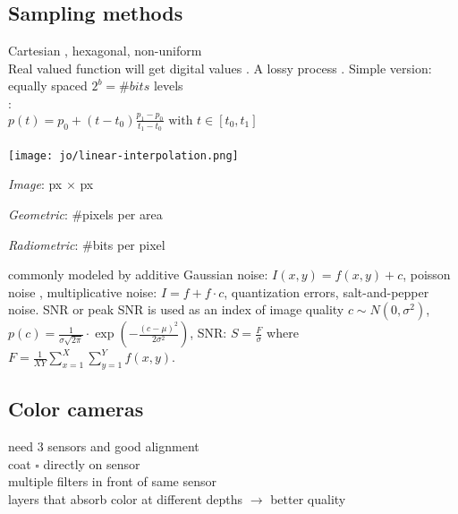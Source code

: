 \subsection*{Sampling methods}
Cartesian , hexagonal, non-uniform\\
 Real valued function will get digital values . A lossy process . Simple version: equally spaced $2^b = \#bits$ levels\\
: \\
$p(t) = p_0 + (t - t_0)\frac{p_1 - p_0}{t_1 - t_0} \text{ with } t \in [t_0, t_1]$ \\

     \\
\texttt{[image: jo/linear-interpolation.png]} \\ 
    \begin{compactitem}
      \item \textit{Image}: px \(\times\) px
      \item \textit{Geometric}: \#pixels per area
      \item \textit{Radiometric}: \#bits per pixel
    \end{compactitem}
 commonly modeled by additive Gaussian noise: $I(x, y) = f(x, y) + c$, poisson noise , multiplicative noise: $I = f + f \cdot c$, quantization errors, salt-and-pepper noise. SNR or peak SNR is used as an index of image quality $c \sim N(0, \sigma^2)$, $p(c) = \frac{1}{\sigma \sqrt{2\pi}} \cdot \exp\left(-\frac{(c - \mu)^2}{2\sigma^2}\right)$, SNR: $S = \frac{F}{\sigma}$ where $F = \frac{1}{XY}\sum_{x = 1}^X \sum_{y = 1}^{Y} f(x, y)$.
\subsection*{Color cameras}
 need 3 sensors and good alignment\\
 coat $\square$ directly on sensor \\
 multiple filters in front of same sensor\\
 layers that absorb color at different depths $\rightarrow$ better quality